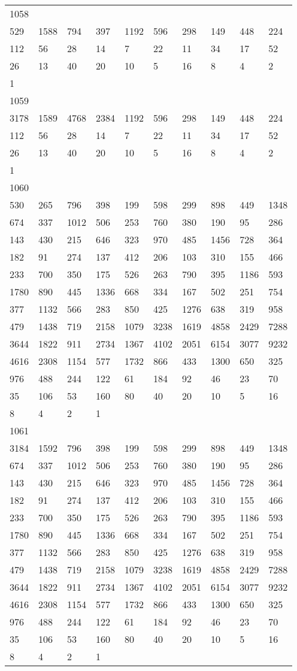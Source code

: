 \begin{longtable}{*{10}{l}}
1058&&&&&&&&&\\
529& 1588& 794& 397& 1192& 596& 298& 149& 448& 224\\
112& 56& 28& 14& 7& 22& 11& 34& 17& 52\\
26& 13& 40& 20& 10& 5& 16& 8& 4& 2\\
1& \\

1059&&&&&&&&&\\
3178& 1589& 4768& 2384& 1192& 596& 298& 149& 448& 224\\
112& 56& 28& 14& 7& 22& 11& 34& 17& 52\\
26& 13& 40& 20& 10& 5& 16& 8& 4& 2\\
1& \\

1060&&&&&&&&&\\
530& 265& 796& 398& 199& 598& 299& 898& 449& 1348\\
674& 337& 1012& 506& 253& 760& 380& 190& 95& 286\\
143& 430& 215& 646& 323& 970& 485& 1456& 728& 364\\
182& 91& 274& 137& 412& 206& 103& 310& 155& 466\\
233& 700& 350& 175& 526& 263& 790& 395& 1186& 593\\
1780& 890& 445& 1336& 668& 334& 167& 502& 251& 754\\
377& 1132& 566& 283& 850& 425& 1276& 638& 319& 958\\
479& 1438& 719& 2158& 1079& 3238& 1619& 4858& 2429& 7288\\
3644& 1822& 911& 2734& 1367& 4102& 2051& 6154& 3077& 9232\\
4616& 2308& 1154& 577& 1732& 866& 433& 1300& 650& 325\\
976& 488& 244& 122& 61& 184& 92& 46& 23& 70\\
35& 106& 53& 160& 80& 40& 20& 10& 5& 16\\
8& 4& 2& 1& \\

1061&&&&&&&&&\\
3184& 1592& 796& 398& 199& 598& 299& 898& 449& 1348\\
674& 337& 1012& 506& 253& 760& 380& 190& 95& 286\\
143& 430& 215& 646& 323& 970& 485& 1456& 728& 364\\
182& 91& 274& 137& 412& 206& 103& 310& 155& 466\\
233& 700& 350& 175& 526& 263& 790& 395& 1186& 593\\
1780& 890& 445& 1336& 668& 334& 167& 502& 251& 754\\
377& 1132& 566& 283& 850& 425& 1276& 638& 319& 958\\
479& 1438& 719& 2158& 1079& 3238& 1619& 4858& 2429& 7288\\
3644& 1822& 911& 2734& 1367& 4102& 2051& 6154& 3077& 9232\\
4616& 2308& 1154& 577& 1732& 866& 433& 1300& 650& 325\\
976& 488& 244& 122& 61& 184& 92& 46& 23& 70\\
35& 106& 53& 160& 80& 40& 20& 10& 5& 16\\
8& 4& 2& 1& \\


\end{longtable}

